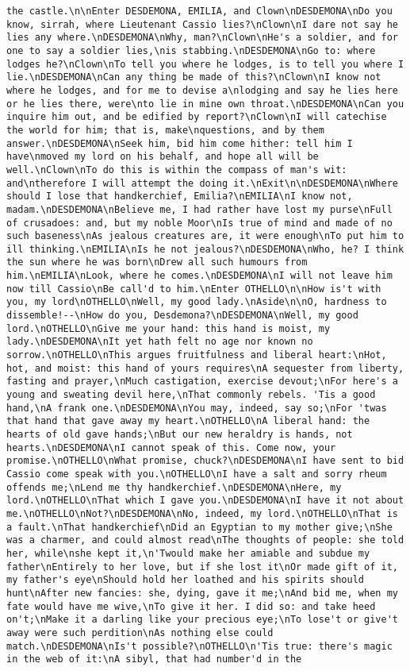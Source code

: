 \begin{verbatim}
the castle.\n\nEnter DESDEMONA, EMILIA, and Clown\nDESDEMONA\nDo you know, sirrah, where Lieutenant Cassio lies?\nClown\nI dare not say he lies any where.\nDESDEMONA\nWhy, man?\nClown\nHe's a soldier, and for one to say a soldier lies,\nis stabbing.\nDESDEMONA\nGo to: where lodges he?\nClown\nTo tell you where he lodges, is to tell you where I lie.\nDESDEMONA\nCan any thing be made of this?\nClown\nI know not where he lodges, and for me to devise a\nlodging and say he lies here or he lies there, were\nto lie in mine own throat.\nDESDEMONA\nCan you inquire him out, and be edified by report?\nClown\nI will catechise the world for him; that is, make\nquestions, and by them answer.\nDESDEMONA\nSeek him, bid him come hither: tell him I have\nmoved my lord on his behalf, and hope all will be well.\nClown\nTo do this is within the compass of man's wit: and\ntherefore I will attempt the doing it.\nExit\n\nDESDEMONA\nWhere should I lose that handkerchief, Emilia?\nEMILIA\nI know not, madam.\nDESDEMONA\nBelieve me, I had rather have lost my purse\nFull of crusadoes: and, but my noble Moor\nIs true of mind and made of no such baseness\nAs jealous creatures are, it were enough\nTo put him to ill thinking.\nEMILIA\nIs he not jealous?\nDESDEMONA\nWho, he? I think the sun where he was born\nDrew all such humours from him.\nEMILIA\nLook, where he comes.\nDESDEMONA\nI will not leave him now till Cassio\nBe call'd to him.\nEnter OTHELLO\n\nHow is't with you, my lord\nOTHELLO\nWell, my good lady.\nAside\n\nO, hardness to dissemble!--\nHow do you, Desdemona?\nDESDEMONA\nWell, my good lord.\nOTHELLO\nGive me your hand: this hand is moist, my lady.\nDESDEMONA\nIt yet hath felt no age nor known no sorrow.\nOTHELLO\nThis argues fruitfulness and liberal heart:\nHot, hot, and moist: this hand of yours requires\nA sequester from liberty, fasting and prayer,\nMuch castigation, exercise devout;\nFor here's a young and sweating devil here,\nThat commonly rebels. 'Tis a good hand,\nA frank one.\nDESDEMONA\nYou may, indeed, say so;\nFor 'twas that hand that gave away my heart.\nOTHELLO\nA liberal hand: the hearts of old gave hands;\nBut our new heraldry is hands, not hearts.\nDESDEMONA\nI cannot speak of this. Come now, your promise.\nOTHELLO\nWhat promise, chuck?\nDESDEMONA\nI have sent to bid Cassio come speak with you.\nOTHELLO\nI have a salt and sorry rheum offends me;\nLend me thy handkerchief.\nDESDEMONA\nHere, my lord.\nOTHELLO\nThat which I gave you.\nDESDEMONA\nI have it not about me.\nOTHELLO\nNot?\nDESDEMONA\nNo, indeed, my lord.\nOTHELLO\nThat is a fault.\nThat handkerchief\nDid an Egyptian to my mother give;\nShe was a charmer, and could almost read\nThe thoughts of people: she told her, while\nshe kept it,\n'Twould make her amiable and subdue my father\nEntirely to her love, but if she lost it\nOr made gift of it, my father's eye\nShould hold her loathed and his spirits should hunt\nAfter new fancies: she, dying, gave it me;\nAnd bid me, when my fate would have me wive,\nTo give it her. I did so: and take heed on't;\nMake it a darling like your precious eye;\nTo lose't or give't away were such perdition\nAs nothing else could match.\nDESDEMONA\nIs't possible?\nOTHELLO\n'Tis true: there's magic in the web of it:\nA sibyl, that had number'd in the 
\end{verbatim}
